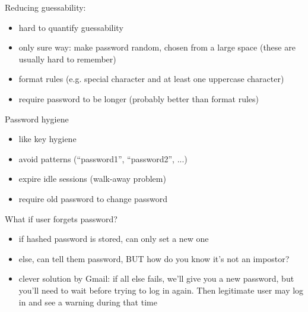 
Reducing guessability:
\begin{itemize}
	\item hard to quantify guessability
	\item only sure way: make password random, chosen from a large space (these are usually hard to remember)
	\item format rules (e.g. special character and at least one uppercase character)
	\item require password to be longer (probably better than format rules)
\end{itemize}

Password hygiene
\begin{itemize}
    \item like key hygiene
    \item avoid patterns (``password1'', ``password2'', ...)
    \item expire idle sessions (walk-away problem)
    \item require old password to change password
\end{itemize}

What if user forgets password?
\begin{itemize}
    \item if hashed password is stored, can only set a new one
    \item else, can tell them password, BUT how do you know it's not an
            impostor?
    \item clever solution by Gmail: if all else fails, we'll give you a new
            password, but you'll need to wait before trying to log in again.
            Then legitimate user may log in and see a warning during that time
\end{itemize}

